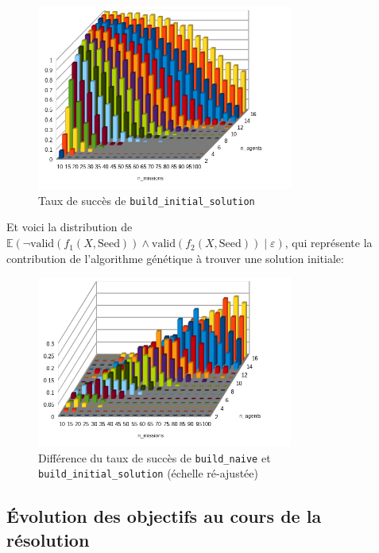 \documentclass[11pt]{article}
\begin{document}
\begin{figure}[H]
    \centering
    \includegraphics[width=0.75\textwidth]{Images/initial.png}
    \caption{Taux de succès de \texttt{build\_initial\_solution}}
    \label{fig:initial_success}
\end{figure}

Et voici la distribution de $\mathbb{E}(\neg \text{valid}(f_1(X, \text{Seed})) \land \text{valid}(f_2(X, \text{Seed})) \;\vert\; \varepsilon)$, qui représente la contribution de l'algorithme génétique à trouver une solution initiale:

\begin{figure}[H]
    \centering
    \includegraphics[width=0.75\textwidth]{Images/initial-diff.png}
    \caption{Différence du taux de succès de \texttt{build\_naive} et \texttt{build\_initial\_solution} (échelle ré-ajustée)}
    \label{fig:diff_success}
\end{figure}

\subsection{Évolution des objectifs au cours de la résolution}
\end{document}
